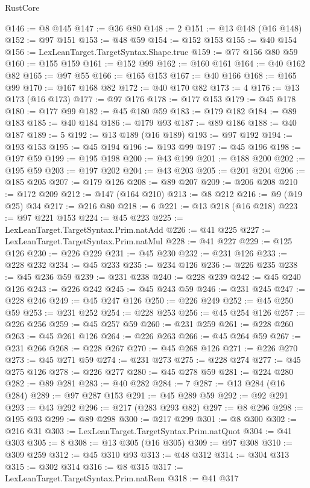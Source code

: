 \begin{lexlean}{RustCore}
\begin{coremodule}
@146 := @8 @145
@147 := @36 @80
@148 := 2
@151 := @13 @148 (@16 @148)
@152 := @97 @151
@153 := @48 @59
@154 := @152 @153
@155 := @40 @154
@156 := LexLeanTarget.TargetSyntax.Shape.true
@159 := @77 @156 @80 @59
@160 := @155 @159
@161 := @152 @99
@162 := @160 @161
@164 := @40 @162 @82
@165 := @97 @55
@166 := @165 @153
@167 := @40 @166
@168 := @165 @99
@170 := @167 @168 @82
@172 := @40 @170 @82
@173 := 4
@176 := @13 @173 (@16 @173)
@177 := @97 @176
@178 := @177 @153
@179 := @45 @178
@180 := @177 @99
@182 := @45 @180 @59
@183 := @179 @182
@184 := @89 @183
@185 := @40 @184
@186 := @179 @93
@187 := @89 @186
@188 := @40 @187
@189 := 5
@192 := @13 @189 (@16 @189)
@193 := @97 @192
@194 := @193 @153
@195 := @45 @194
@196 := @193 @99
@197 := @45 @196
@198 := @197 @59
@199 := @195 @198
@200 := @43 @199
@201 := @188 @200
@202 := @195 @59
@203 := @197 @202
@204 := @43 @203
@205 := @201 @204
@206 := @185 @205
@207 := @179 @126
@208 := @89 @207
@209 := @206 @208
@210 := @172 @209
@212 := @147 (@164 @210)
@213 := @8 @212
@216 := @9 (@19 @25) @34
@217 := @216 @80
@218 := 6
@221 := @13 @218 (@16 @218)
@223 := @97 @221 @153
@224 := @45 @223
@225 := LexLeanTarget.TargetSyntax.Prim.natAdd
@226 := @41 @225
@227 := LexLeanTarget.TargetSyntax.Prim.natMul
@228 := @41 @227
@229 := @125 @126
@230 := @226 @229
@231 := @45 @230
@232 := @231 @126
@233 := @228 @232
@234 := @45 @233
@235 := @234 @126
@236 := @226 @235
@238 := @45 @236 @59
@239 := @231 @238
@240 := @228 @239
@242 := @45 @240 @126
@243 := @226 @242
@245 := @45 @243 @59
@246 := @231 @245
@247 := @228 @246
@249 := @45 @247 @126
@250 := @226 @249
@252 := @45 @250 @59
@253 := @231 @252
@254 := @228 @253
@256 := @45 @254 @126
@257 := @226 @256
@259 := @45 @257 @59
@260 := @231 @259
@261 := @228 @260
@263 := @45 @261 @126
@264 := @226 @263
@266 := @45 @264 @59
@267 := @231 @266
@268 := @228 @267
@270 := @45 @268 @126
@271 := @226 @270
@273 := @45 @271 @59
@274 := @231 @273
@275 := @228 @274
@277 := @45 @275 @126
@278 := @226 @277
@280 := @45 @278 @59
@281 := @224 @280
@282 := @89 @281
@283 := @40 @282
@284 := 7
@287 := @13 @284 (@16 @284)
@289 := @97 @287 @153
@291 := @45 @289 @59
@292 := @92 @291
@293 := @43 @292
@296 := @217 (@283 @293 @82)
@297 := @8 @296
@298 := @195 @93
@299 := @89 @298
@300 := @217 @299
@301 := @8 @300
@302 := @216 @31
@303 := LexLeanTarget.TargetSyntax.Prim.natQuot
@304 := @41 @303
@305 := 8
@308 := @13 @305 (@16 @305)
@309 := @97 @308
@310 := @309 @259
@312 := @45 @310 @93
@313 := @48 @312
@314 := @304 @313
@315 := @302 @314
@316 := @8 @315
@317 := LexLeanTarget.TargetSyntax.Prim.natRem
@318 := @41 @317

\end{coremodule}
\end{lexlean}
